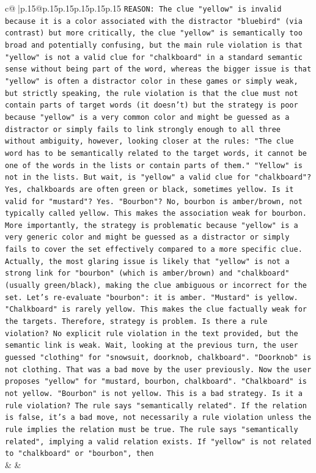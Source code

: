 \documentclass{article}
\begin{document}
{\begin{supertabular}{c@{$\;$}|p{.15\linewidth}@{}p{.15\linewidth}p{.15\linewidth}p{.15\linewidth}p{.15\linewidth}p{.15\linewidth}}
{{{\texttt{REASON: The clue "yellow" is invalid because it is a color associated with the distractor "bluebird" (via contrast) but more critically, the clue "yellow" is semantically too broad and potentially confusing, but the main rule violation is that "yellow" is not a valid clue for "chalkboard" in a standard semantic sense without being part of the word, whereas the bigger issue is that "yellow" is often a distractor color in these games or simply weak, but strictly speaking, the rule violation is that the clue must not contain parts of target words (it doesn't) but the strategy is poor because "yellow" is a very common color and might be guessed as a distractor or simply fails to link strongly enough to all three without ambiguity, however, looking closer at the rules: "The clue word has to be semantically related to the target words, it cannot be one of the words in the lists or contain parts of them." "Yellow" is not in the lists. But wait, is "yellow" a valid clue for "chalkboard"? Yes, chalkboards are often green or black, sometimes yellow. Is it valid for "mustard"? Yes. "Bourbon"? No, bourbon is amber/brown, not typically called yellow. This makes the association weak for bourbon. More importantly, the strategy is problematic because "yellow" is a very generic color and might be guessed as a distractor or simply fails to cover the set effectively compared to a more specific clue. Actually, the most glaring issue is likely that "yellow" is not a strong link for "bourbon" (which is amber/brown) and "chalkboard" (usually green/black), making the clue ambiguous or incorrect for the set. Let's re{-}evaluate "bourbon": it is amber. "Mustard" is yellow. "Chalkboard" is rarely yellow. This makes the clue factually weak for the targets. Therefore, strategy is problem. Is there a rule violation? No explicit rule violation in the text provided, but the semantic link is weak. Wait, looking at the previous turn, the user guessed "clothing" for "snowsuit, doorknob, chalkboard". "Doorknob" is not clothing. That was a bad move by the user previously. Now the user proposes "yellow" for "mustard, bourbon, chalkboard". "Chalkboard" is not yellow. "Bourbon" is not yellow. This is a bad strategy. Is it a rule violation? The rule says "semantically related". If the relation is false, it's a bad move, not necessarily a rule violation unless the rule implies the relation must be true. The rule says "semantically related", implying a valid relation exists. If "yellow" is not related to "chalkboard" or "bourbon", then} \\
            }
        }
    }
    & & \\ \\


\end{supertabular}}
\end{document}
